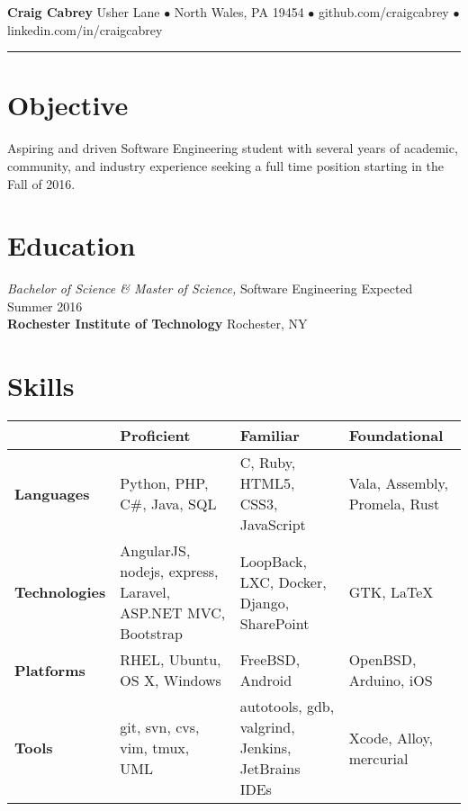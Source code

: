 \documentclass[margin]{res}
\newcommand{\fullbar}{\rule{\textwidth}{0.4pt}}
\begin{document}
{\Huge\textbf{Craig Cabrey}}
\vspace{0.25cm}
 Usher Lane $\bullet$
North Wales, PA 19454 $\bullet$
github.com/craigcabrey $\bullet$
linkedin.com/in/craigcabrey \vspace{-0.5cm}
\newline
\fullbar
\vspace{-0.5cm}

\begin{resume}

\section{Objective}  

Aspiring and driven Software Engineering student with several years of
academic, community, and industry experience seeking a full time position
starting in the Fall of 2016.

\section{Education}

{\sl Bachelor of Science \& Master of Science,} Software Engineering
\hfill Expected Summer 2016 \\
\textbf{Rochester Institute of Technology} \hfill Rochester, NY
 
\section{Skills} 

{
\small
\renewcommand{\arraystretch}{1.5}
\begin{tabular}{
    >{\arraybackslash}p{2cm}
    >{\arraybackslash}p{4.5cm}
    >{\arraybackslash}p{3.5cm}
    >{\arraybackslash}p{3.5cm}}
    & \textbf{Proficient} & \textbf{Familiar} & \textbf{Foundational} \\ \hline
  \textbf{Languages} & Python, PHP, C\#, Java, SQL & C, Ruby, HTML5, CSS3,
                       JavaScript & Vala, Assembly, Promela, Rust\\ \hline
  \textbf{Technologies} & AngularJS, nodejs, express, Laravel,
                          ASP.NET MVC, Bootstrap & LoopBack, LXC, Docker,
                          Django, SharePoint & GTK, \LaTeX \\ \hline
  \textbf{Platforms} & RHEL, Ubuntu, OS X, Windows & FreeBSD, Android &
                       OpenBSD, Arduino, iOS \\ \hline
  \textbf{Tools} & git, svn, cvs, vim, tmux, UML & autotools, gdb, valgrind,
                   Jenkins, JetBrains IDEs & Xcode, Alloy, mercurial
\end{tabular}
}


\end{resume}
\end{document}
